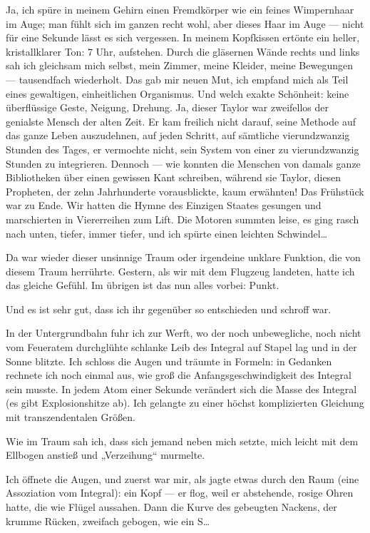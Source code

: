 Ja, ich spüre in meinem Gehirn einen Fremdkörper wie ein feines
Wimpernhaar im Auge; man fühlt sich im ganzen recht wohl, aber
dieses Haar im Auge — nicht für eine Sekunde lässt es sich
vergessen. In meinem Kopfkissen ertönte ein heller, kristallklarer
Ton: 7 Uhr, aufstehen. Durch die gläsernen Wände rechts und links
sah ich gleichsam mich selbst, mein Zimmer, meine Kleider, meine
Bewegungen — tausendfach wiederholt. Das gab mir neuen Mut, ich
empfand mich als Teil eines gewaltigen, einheitlichen Organismus.
Und welch exakte Schönheit: keine überflüssige Geste, Neigung,
Drehung. Ja, dieser Taylor war zweifellos der genialste Mensch der
alten Zeit. Er kam freilich nicht darauf, seine Methode auf das
ganze Leben auszudehnen, auf jeden Schritt, auf sämtliche
vierundzwanzig Stunden des Tages, er vermochte nicht, sein System
von einer zu vierundzwanzig Stunden zu integrieren. Dennoch — wie
konnten die Menschen von damals ganze Bibliotheken über einen
gewissen Kant schreiben, während sie Taylor, diesen Propheten, der
zehn Jahrhunderte vorausblickte, kaum erwähnten! Das Frühstück war
zu Ende. Wir hatten die Hymne des Einzigen Staates gesungen und
marschierten in Viererreihen zum Lift. Die Motoren summten leise,
es ging rasch nach unten, tiefer, immer tiefer, und ich spürte
einen leichten Schwindel\ldots{}

Da war wieder dieser unsinnige Traum oder irgendeine unklare
Funktion, die von diesem Traum herrührte. Gestern, als wir mit dem
Flugzeug landeten, hatte ich das gleiche Gefühl. Im übrigen ist das
nun alles vorbei: Punkt.

Und es ist sehr gut, dass ich ihr gegenüber so entschieden und
schroff war.

In der Untergrundbahn fuhr ich zur Werft, wo der noch unbewegliche,
noch nicht vom Feueratem durchglühte schlanke Leib des Integral auf
Stapel lag und in der Sonne blitzte. Ich schloss die Augen und
träumte in Formeln: in Gedanken rechnete ich noch einmal aus, wie
groß die Anfangsgeschwindigkeit des Integral sein musste. In jedem
Atom einer Sekunde verändert sich die Masse des Integral (es gibt
Explosionshitze ab). Ich gelangte zu einer höchst komplizierten
Gleichung mit transzendentalen Größen.

Wie im Traum sah ich, dass sich jemand neben mich setzte, mich
leicht mit dem Ellbogen anstieß und „Verzeihung“ murmelte.

Ich öffnete die Augen, und zuerst war mir, als jagte etwas durch
den Raum (eine Assoziation vom Integral): ein Kopf — er flog, weil
er abstehende, rosige Ohren hatte, die wie Flügel aussahen. Dann
die Kurve des gebeugten Nackens, der krumme Rücken, zweifach
gebogen, wie ein S\ldots{}

